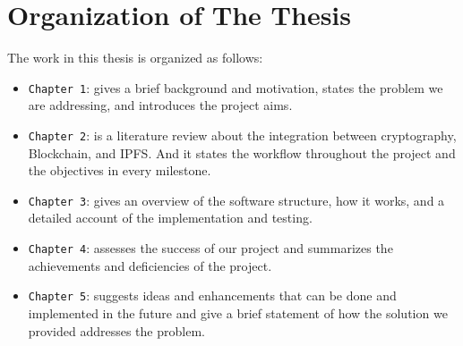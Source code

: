 \section{Organization of The Thesis}

The work in this thesis is organized as follows:

\begin{itemize}
\item \texttt{Chapter 1}: gives a brief background and motivation, states the problem we are addressing, and introduces the project aims.
\item \texttt{Chapter 2}: is a literature review about the integration between cryptography, Blockchain, and IPFS. And it states the workflow throughout the project and the objectives in every milestone.
\item \texttt{Chapter 3}: gives an overview of the software structure, how it works, and a detailed account of the implementation and testing.
\item \texttt{Chapter 4}: assesses the success of our project and summarizes the achievements and deficiencies of the project.
\item \texttt{Chapter 5}: suggests ideas and enhancements that can be done and implemented in the future and give a brief statement of how the solution we provided addresses the problem.
\end{itemize}